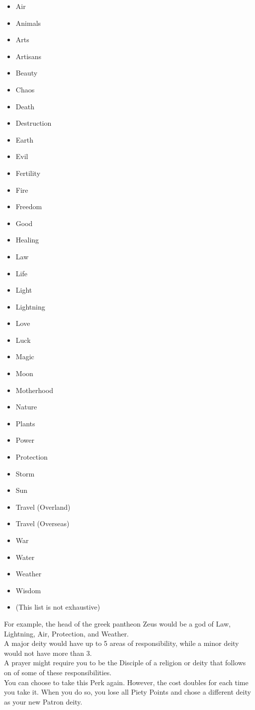 \begin{itemize}
    \item Air
    \item Animals
    \item Arts
    \item Artisans
    \item Beauty
    \item Chaos
    \item Death
    \item Destruction
    \item Earth
    \item Evil
    \item Fertility
    \item Fire
    \item Freedom
    \item Good
    \item Healing
    \item Law
    \item Life
    \item Light
    \item Lightning
    \item Love
    \item Luck
    \item Magic
    \item Moon
    \item Motherhood
    \item Nature
    \item Plants
    \item Power
    \item Protection
    \item Storm
    \item Sun
    \item Travel (Overland)
    \item Travel (Overseas)
    \item War
    \item Water
    \item Weather
    \item Wisdom
    \item (This list is not exhaustive)
\end{itemize}
For example, the head of the greek pantheon Zeus would be a god of Law, Lightning, Air, Protection, and Weather.\\
A major deity would have up to 5 areas of responsibility, while a minor deity would not have more than 3.\\
A prayer might require you to be the Disciple of a religion or deity that follows on of some of these responsibilities.
\\
You can choose to take this Perk again.
However, the cost doubles for each time you take it.
When you do so, you lose all Piety Points and chose a different deity as your new Patron deity.